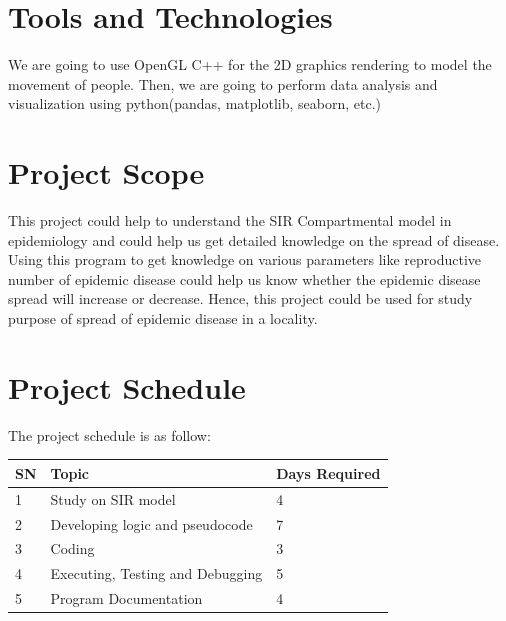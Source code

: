 \documentclass[a4paper, 12pt]{article}
\begin{document}
\section{Tools and Technologies}
We are going to use OpenGL C++ for the 2D graphics rendering to model the movement of people. Then, we are going to perform data analysis and visualization using python(pandas, matplotlib, seaborn, etc.)


\section{Project Scope}
This project could help to understand the SIR Compartmental model in epidemiology and could help us get detailed knowledge on the spread of disease. Using this program to get knowledge on various parameters like reproductive number of epidemic disease could help us know whether the epidemic disease spread will increase or decrease. Hence, this project could be used for study purpose of spread of epidemic disease in a locality.

\clearpage
\section{Project Schedule}
The project schedule is as follow:

\begin{center}
\begin{tabular}{ | m{1cm} | m{10cm}| m{2cm} | } 
  \hline
  SN & Topic & Days Required \\ 
  \hline
  1 & Study on SIR model & 4 \\ 
  \hline
  2 & Developing logic and pseudocode & 7 \\ 
  \hline
  3 & Coding & 3 \\ 
  \hline
  4 & Executing, Testing and Debugging & 5 \\ 
  \hline
  5 & Program Documentation & 4 \\ 
  \hline
\end{tabular}
\end{center}
\end{document}
